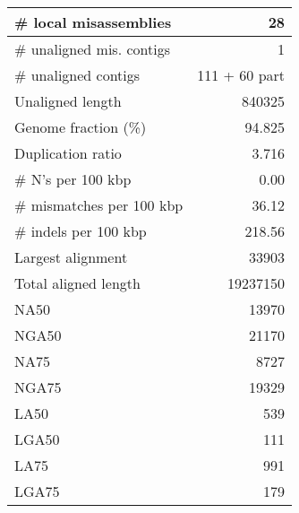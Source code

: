 \documentclass[12pt,a4paper]{article}
\begin{document}
\begin{table}[ht]
\begin{center}
\begin{tabular}{|l*{1}{|r}|}
\# local misassemblies & 28 \\ \hline
\# unaligned mis. contigs & 1 \\ \hline
\# unaligned contigs & 111 + 60 part \\ \hline
Unaligned length & 840325 \\ \hline
Genome fraction (\%) & 94.825 \\ \hline
Duplication ratio & 3.716 \\ \hline
\# N's per 100 kbp & 0.00 \\ \hline
\# mismatches per 100 kbp & 36.12 \\ \hline
\# indels per 100 kbp & 218.56 \\ \hline
Largest alignment & 33903 \\ \hline
Total aligned length & 19237150 \\ \hline
NA50 & 13970 \\ \hline
NGA50 & 21170 \\ \hline
NA75 & 8727 \\ \hline
NGA75 & 19329 \\ \hline
LA50 & 539 \\ \hline
LGA50 & 111 \\ \hline
LA75 & 991 \\ \hline
LGA75 & 179 \\ \hline
\end{tabular}
\end{center}
\end{table}
\end{document}
